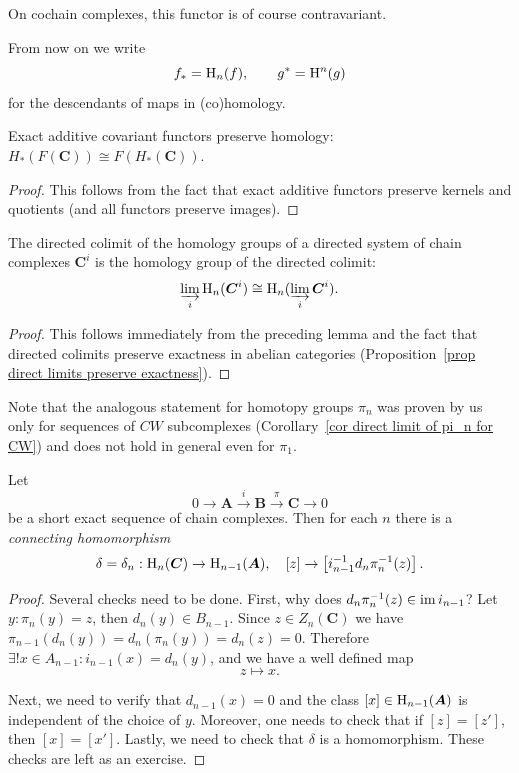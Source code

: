 \begin{rem}
    On cochain complexes, this functor is of course contravariant.
\end{rem}

From now on we write
\[f_\ast=\mathrm{H}_n(f),\quad\quad g^\ast=\mathrm{H}^n(g)\]
for the descendants of maps in (co)homology.

\begin{lem}
    Exact additive covariant functors preserve homology: $H_\ast(F(\bm{C}))\cong F(H_\ast(\bm{C}))$.
\end{lem}
\begin{proof}
    This follows from the fact that exact additive functors preserve kernels and quotients (and all functors preserve images).
\end{proof}

\begin{prop}
    The directed colimit of the homology groups of a directed system of chain complexes $\bm{C}^i$ is the homology group  of the directed colimit:
    \[\varinjlim_i \mathrm{H}_n(\boldsymbol{C}^i)\cong \mathrm{H}_n(\varinjlim_i \boldsymbol{C}^i).\]
\end{prop}
\begin{proof}
    This follows immediately from the preceding lemma and the fact that directed colimits preserve exactness in abelian categories (Proposition~\ref{prop direct limits preserve exactness}).
\end{proof}
\begin{rem}
    Note that the analogous statement for homotopy groups $\pi_n$ was proven by us only for sequences of $CW$ subcomplexes (Corollary~\ref{cor direct limit of pi_n for CW}) and does not hold in general even for $\pi_1$.
\end{rem}



\begin{thm}\label{connecting hom in homology}
    Let 
    \[0\to \bm{A}\overset i\to \bm{B}\overset\pi\to \bm{C}\to 0 \]
    be a short exact sequence of chain complexes. Then for each $n$ there is a \emph{connecting homomorphism}
    \[\delta=\delta_n:\mathrm{H}_n(\boldsymbol{C})\to \mathrm{H}_{n-1}(\boldsymbol{A}),\quad [z]\to \left[i_{n-1}^{-1} d_n\pi_n^{-1}(z)\right].\]
\end{thm}
\begin{proof}
    Several checks need to be done. First, why does $d_n\pi_n^{-1}(z)\in\operatorname{im} i_{n-1}$? Let $y:\pi_n(y)=z$, then $d_n(y)\in B_{n-1}$. Since $z\in Z_n(\bm{C})$ we have $\pi_{n-1}(d_n(y))=d_n(\pi_n(y))=d_n(z)=0$. Therefore $\exists ! x\in A_{n-1}:i_{n-1}(x)=d_n(y)$, and we have a well defined map
    \[z\mapsto x.\]
    
    Next, we need to verify that $d_{n-1}(x)=0$ and the class $[x]\in \mathrm{H}_{n-1}(\boldsymbol{A})$ is independent of the choice of $y$.
    Moreover, one needs to check that if $[z]=[z']$, then $[x]=[x']$. Lastly, we need to check that $\delta$ is a homomorphism. These checks are left as an exercise.
\end{proof}

